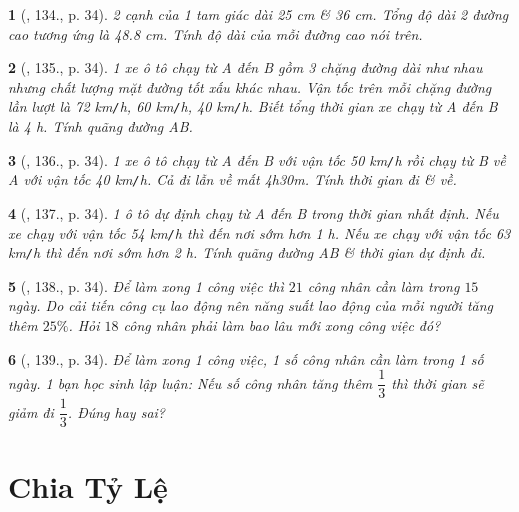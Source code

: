 \documentclass{article}
\newtheorem{baitoan}{}
\begin{document}
\begin{baitoan}[\cite{Tuyen_Toan_7}, 134., p. 34]
	2 cạnh của 1 tam giác dài {\rm25 cm} \& {\rm36 cm}. Tổng độ dài 2 đường cao tương ứng là {\rm48.8 cm}. Tính độ dài của mỗi đường cao nói trên.
\end{baitoan}

\begin{baitoan}[\cite{Tuyen_Toan_7}, 135., p. 34]
	1 xe ô tô chạy từ A đến B gồm 3 chặng đường dài như nhau nhưng chất lượng mặt đường tốt xấu khác nhau. Vận tốc trên mỗi chặng đường lần lượt là {\rm72 km{\tt/}h}, {\rm60 km{\tt/}h}, {\rm40 km{\tt/}h}. Biết tổng thời gian xe chạy từ A đến B là {\rm4 h}. Tính quãng đường AB.
\end{baitoan}

\begin{baitoan}[\cite{Tuyen_Toan_7}, 136., p. 34]	
	1 xe ô tô chạy từ A đến B với vận tốc {\rm50 km{\tt/}h} rồi chạy từ B về A với vận tốc {\rm40 km{\tt/}h}. Cả đi lẫn về mất {\rm4h30m}. Tính thời gian đi \& về.
\end{baitoan}

\begin{baitoan}[\cite{Tuyen_Toan_7}, 137., p. 34]
	1 ô tô dự định chạy từ A đến B trong thời gian nhất định. Nếu xe chạy với vận tốc {\rm54 km{\tt/}h} thì đến nơi sớm hơn {\rm1 h}. Nếu xe chạy với vận tốc {\rm63 km{\tt/}h} thì đến nơi sớm hơn {\rm2 h}. Tính quãng đường AB \& thời gian dự định đi.
\end{baitoan}

\begin{baitoan}[\cite{Tuyen_Toan_7}, 138., p. 34]
	Để làm xong 1 công việc thì $21$ công nhân cần làm trong $15$ ngày. Do cải tiến công cụ lao động nên năng suất lao động của mỗi người tăng thêm $25\%$. Hỏi $18$ công nhân phải làm bao lâu mới xong công việc đó?
\end{baitoan}

\begin{baitoan}[\cite{Tuyen_Toan_7}, 139., p. 34]
	Để làm xong 1 công việc, 1 số công nhân cần làm trong 1 số ngày. 1 bạn học sinh lập luận: Nếu số công nhân tăng thêm $\dfrac{1}{3}$ thì thời gian sẽ giảm đi $\dfrac{1}{3}$. Đúng hay sai?
\end{baitoan}


\section{Chia Tỷ Lệ}
\end{document}
